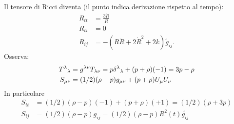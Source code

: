 Il tensore di Ricci diventa (il punto indica derivazione rispetto al tempo):
\begin{subequations}
  \begin{align}
    R_{tt} &= \frac{ 3 \ddot{R}}{R} \\
    R_{ti} &= 0 \\
    R_{ij} &= -(R\ddot{R}+2\dot{R}^2+2k) \tilde{g}_{ij}.
  \end{align}
\end{subequations}
Osserva:
\begin{subequations}
  \begin{align}
    \tensor{T}{^{\lambda}}{_{\lambda}} &= g^{\lambda\nu} T_{\lambda\nu} = p
    \tensor{\delta}{^{\lambda}}_{{\lambda}} + (p+\rho) (-1) = 3p - \rho \\
    S_{\mu \nu} &= (1/2) (\rho-p) g_{\mu\nu}+(p+\rho)U_{\mu} U_{\nu}
  \end{align}
\end{subequations}
In particolare
\begin{subequations}
  \begin{align}
    S_{tt} &= (1/2) (\rho-p)(-1)+(p+\rho)(+1) = (1/2)(\rho+3p) \\
    \label{sij}
    S_{ij} &= (1/2)(\rho-p) g_{ij}= (1/2)(\rho-p) R^2(t) \tilde{g_{ij}}
  \end{align}
\end{subequations}

